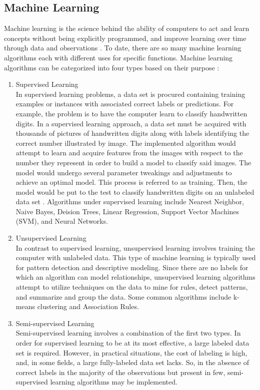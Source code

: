 \subsection{Machine Learning}

\qquad Machine learning is the science behind the ability of computers to act and learn concepts without being explicitly programmed, and improve learning over time through data and observations \cite{machineLearning}. To date, there are so many machine learning algorithms each with different uses for specific functions. Machine learning algorithms can be categorized into four types based on their purpose \cite{machineLearningTypes}:

\begin{enumerate}
	\item{Supervised Learning} \\
	In supervised learning problems, a data set is procured containing training examples or instances with associated correct labels or predictions. For example, the problem is to have the computer learn to classify handwritten digits. In a supervised learning approach, a data set must be acquired with thousands of pictures of handwritten digits along with labels identifying the correct number illustrated by image. The implemented algorithm would attempt to learn and acquire features from the images with respect to the number they represent in order to build a model to classify said images. The model would undergo several parameter tweakings and adjustments to achieve an optimal model. This process is referred to as training. Then, the model would be put to the test to classify handwritten digits on an unlabeled data set \cite{supervisedLearning}. Algorithms under supervised learning include Nearest Neighbor, Naive Bayes, Deision Trees, Linear Regression, Support Vector Machines (SVM), and Neural Networks.

	\item{Unsupervised Learning} \\
	In contrast to supervised learning, unsupervised learning involves training the computer with unlabeled data. This type of machine learning is typically used for pattern detection and descriptive modeling. Since there are no labels for which an algorithm can model relationships, unsupervised learning algorithms attempt to utilize techniques on the data to mine for rules, detect patterns, and summarize and group the data. Some common algorithms include k-means clustering and Association Rules.

	\item{Semi-supervised Learning} \\
	Semi-supervised learning involves a combination of the first two types. In order for supervised learning to be at its most effective, a large labeled data set is required. However, in practical situations, the cost of labeling is high, and, in some fields, a large fully-labeled data set lacks. So, in the absence of correct labels in the majority of the observations but present in few, semi-supervised learning algorithms may be implemented.
\end{enumerate}

